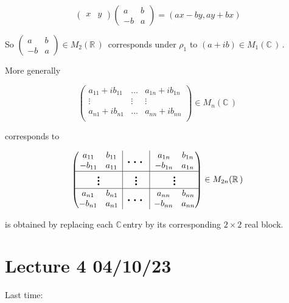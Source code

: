 \documentclass[12pt,a4paper]{article}
\newcommand{\rR}{\ensuremath{\mathbb{R}\,}}
\newcommand{\cC}{\ensuremath{\mathbb{C}\,}}
\newcommand{\mnc}{\ensuremath{M_n(\cC)\,}}
\newcommand{\mr}[1]{\ensuremath{M_{#1}(\rR)\,}}
\newcommand{\mc}[1]{\ensuremath{M_{#1}(\cC)\,}}
\newcommand{\rvline}{\hspace*{-\arraycolsep}\vline\hspace*{-\arraycolsep}}
\newcommand{\bigld}{\mbox{\normalfont\Large\bfseries \ldots}}
\newcommand{\bigvd}{\mbox{\normalfont\Large\bfseries \vdots}}
\begin{document}
\[\begin{pmatrix} x & y\end{pmatrix}\begin{pmatrix} a & b \\ -b & a \end{pmatrix}=(ax-by,ay+bx)\]

So $\begin{pmatrix} a & b \\ -b & a \end{pmatrix}\in \mr{2}$ corresponds under $\rho_1$ to $(a+ib)\in \mc{1}$.

More generally 

\[\begin{pmatrix}
  a_{11}+ib_{11} & \ldots &   a_{1n}+ib_{1n}\\
  \vdots & \vdots & \vdots \\
   a_{n1}+ib_{n1} & \ldots &   a_{nn}+ib_{nn}\\
\end{pmatrix} \in \mnc\]

corresponds to

\[
\begin{pmatrix}
  \begin{matrix}
  a_{11} & b_{11}  \\
  -b_{11} &   a_{11}
  \end{matrix}
  & \rvline & \bigld  & \rvline &
  \begin{matrix}
  a_{1n} & b_{1n}  \\
  -b_{1n} &   a_{1n}
  \end{matrix}  
  \\
\hline

  \bigvd
  & \rvline & \bigvd  & \rvline &
  \bigvd
  \\
\hline
    \begin{matrix}
  a_{n1} & b_{n1}  \\
  -b_{n1} &   a_{n1}
  \end{matrix}
  & \rvline & \bigld  & \rvline &
  \begin{matrix}
  a_{nn} & b_{nn}  \\
  -b_{nn} &   a_{nn}
  \end{matrix}  
\end{pmatrix} \in \mr{2n}
\]

 is obtained by replacing each \cC entry by its corresponding $2\times 2$ real block.

\section{Lecture 4 04/10/23}
Last time:
\end{document}
